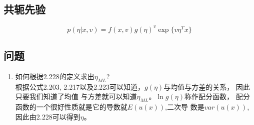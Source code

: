 \subsection{共轭先验}
\begin{equation}
p(\eta|x, v) = f(x, v)g(\eta)^v\exp\{v\eta^Tx\}
\end{equation}


\subsection{问题}
\begin{enumerate}
\item 如何根据2.228的定义求出$\eta_{ML}$?\\
根据公式2.203, 2.217以及2.223可以知道，$g(\eta)$与均值与方差的关系，
因此只要我们知道了均值
与方差就可以知道$\eta_{ML}$。$\ln g(\eta)$称作配分函数，
配分函数的一个很好性质就是它的导数就$E(u(x))$,二次导
数是$var(u(x))$,因此由2.228可以得到$\eta$。
\end{enumerate}
